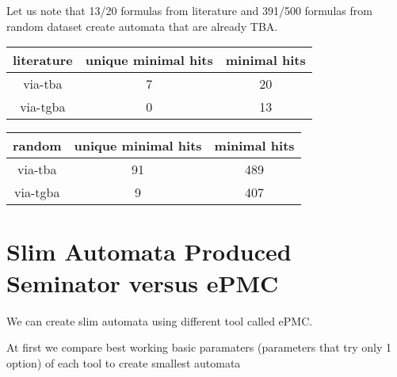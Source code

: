 \documentclass[
	digital
nolof, nolot
]{fithesis3}
\begin{document}
{		 
		\begin{table}[ht]
			Let us note that 13/20 formulas from literature and 391/500 formulas from random dataset create automata that are already TBA.
			\begin{tabular}{ |c|c|c| } 
				\hline
				literature&unique minimal hits&minimal hits\\
				\hline
				via-tba&7 & 20\\
				\hline
				via-tgba&0 & 13\\ 
				\hline
			\end{tabular}
		\end{table}
		\begin{table}[ht]
			\begin{tabular}{ |c|c|c| } 
				\hline
				random&unique minimal hits&minimal hits\\
				\hline
				via-tba&91 & 489\\
				\hline
				via-tgba&9 & 407\\ 
				\hline
			\end{tabular}
		\end{table}
		\clearpage
		\section{Slim Automata Produced Seminator versus ePMC}
		We can create slim automata using different tool called ePMC.
		
		At first we compare best working basic paramaters (parameters that try only 1 option) of each tool to create smallest automata
	
}
\end{document}
